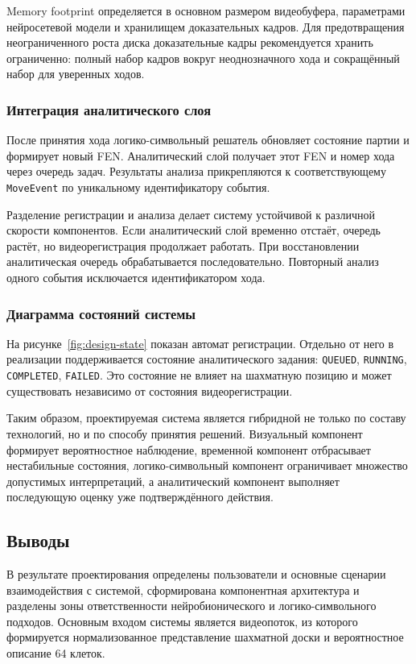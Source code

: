 Memory footprint определяется в основном размером видеобуфера, параметрами нейросетевой модели и хранилищем доказательных кадров. Для предотвращения неограниченного роста диска доказательные кадры рекомендуется хранить ограниченно: полный набор кадров вокруг неоднозначного хода и сокращённый набор для уверенных ходов.

\subsubsection{Интеграция аналитического слоя}

После принятия хода логико-символьный решатель обновляет состояние партии и формирует новый FEN. Аналитический слой получает этот FEN и номер хода через очередь задач. Результаты анализа прикрепляются к соответствующему \texttt{MoveEvent} по уникальному идентификатору события.

Разделение регистрации и анализа делает систему устойчивой к различной скорости компонентов. Если аналитический слой временно отстаёт, очередь растёт, но видеорегистрация продолжает работать. При восстановлении аналитическая очередь обрабатывается последовательно. Повторный анализ одного события исключается идентификатором хода.

\subsubsection{Диаграмма состояний системы}

На рисунке~\ref{fig:design-state} показан автомат регистрации. Отдельно от него в реализации поддерживается состояние аналитического задания: \texttt{QUEUED}, \texttt{RUNNING}, \texttt{COMPLETED}, \texttt{FAILED}. Это состояние не влияет на шахматную позицию и может существовать независимо от состояния видеорегистрации.

Таким образом, проектируемая система является гибридной не только по составу технологий, но и по способу принятия решений. Визуальный компонент формирует вероятностное наблюдение, временной компонент отбрасывает нестабильные состояния, логико-символьный компонент ограничивает множество допустимых интерпретаций, а аналитический компонент выполняет последующую оценку уже подтверждённого действия.

\subsection{Выводы}

В результате проектирования определены пользователи и основные сценарии взаимодействия с системой, сформирована компонентная архитектура и разделены зоны ответственности нейробионического и логико-символьного подходов. Основным входом системы является видеопоток, из которого формируется нормализованное представление шахматной доски и вероятностное описание 64 клеток.

